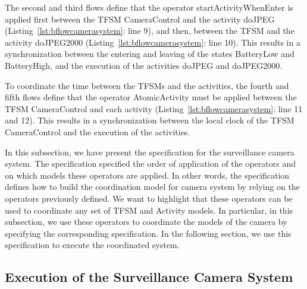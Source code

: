 The second and third flows define that the operator startActivityWhenEnter is applied first between the TFSM CameraControl and the activity doJPEG (Listing~\ref{lst:bflowcamerasystem}: line 9), and then, between the TFSM and the activity doJPEG2000 (Listing~\ref{lst:bflowcamerasystem}: line 10). This results in a synchronization between the entering and leaving of the states BatteryLow and BatteryHigh, and the execution of the activities doJPEG and doJPEG2000. 

To coordinate the time between the TFSMs and the activities, the fourth and fifth flows define that the operator AtomicActivity must be applied between the TFSM CameraControl and each activity (Listing~\ref{lst:bflowcamerasystem}: line 11 and 12). This results in a synchronization between the local clock of the TFSM CameraControl and the execution of the activities. 

In this subsection, we have present the \bflow specification for the surveillance camera system. The specification specified the order of application of the operators and on which models these operators are applied. In other words, the \bflow specification defines how to build the coordination model for camera system by relying on the operators previously defined. We want to highlight that these \bcool operators can be used to coordinate any set of TFSM and Activity models. In particular, in this subsection, we use these operators to coordinate the models of the camera by specifying the corresponding \bflow specification. In the following section, we use this specification to execute the coordinated system.    

\subsection{Execution of the Surveillance Camera System}

